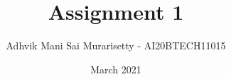 \documentclass[journal,12pt,twocolumn]{IEEEtran}
\date{March 2021}
\DeclareMathOperator*{\Res}{Res}
\begin{document}
\newcommand{\BEQA}{\begin{eqnarray}}
\newcommand{\EEQA}{\end{eqnarray}}
\newcommand{\define}{\stackrel{\triangle}{=}}

\raggedbottom
\setlength{\parindent}{0pt}
\providecommand{\mbf}{\mathbf}
\providecommand{\pr}[1]{\ensuremath{\Pr\left(#1\right)}}
\providecommand{\qfunc}[1]{\ensuremath{Q\left(#1\right)}}
\providecommand{\sbrak}[1]{\ensuremath{{}\left[#1\right]}}
\providecommand{\lsbrak}[1]{\ensuremath{{}\left[#1\right.}}
\providecommand{\rsbrak}[1]{\ensuremath{{}\left.#1\right]}}
\providecommand{\brak}[1]{\ensuremath{\left(#1\right)}}
\providecommand{\lbrak}[1]{\ensuremath{\left(#1\right.}}
\providecommand{\rbrak}[1]{\ensuremath{\left.#1\right)}}
\providecommand{\cbrak}[1]{\ensuremath{\left\{#1\right\}}}
\providecommand{\lcbrak}[1]{\ensuremath{\left\{#1\right.}}
\providecommand{\rcbrak}[1]{\ensuremath{\left.#1\right\}}}
\theoremstyle{remark}
\newtheorem{rem}{Remark}
\newcommand{\sgn}{\mathop{\mathrm{sgn}}}
\providecommand{\abs}[1]{\vert#1\vert}
\providecommand{\res}[1]{\Res\displaylimits_{#1}} 
\providecommand{\norm}[1]{\lVert#1\rVert}
\providecommand{\mtx}[1]{\mathbf{#1}}
\providecommand{\mean}[1]{E[ #1 ]}
\providecommand{\fourier}{\overset{\mathcal{F}}{ \rightleftharpoons}}
\providecommand{\system}{\overset{\mathcal{H}}{ \longleftrightarrow}}
\newcommand{\solution}{\noindent \textbf{Solution: }}
\newcommand{\cosec}{\,\text{cosec}\,}
\providecommand{\dec}[2]{\ensuremath{\overset{#1}{\underset{#2}{\gtrless}}}}
\newcommand{\myvec}[1]{\ensuremath{\begin{pmatrix}#1\end{pmatrix}}}
\newcommand{\mydet}[1]{\ensuremath{\begin{vmatrix}#1\end{vmatrix}}}
\makeatletter
{}
\makeatother
\let\StandardTheFigure\thefigure
\let\vec\mathbf
\renewcommand{\thefigure}{\theproblem}
\def\putbox#1#2#3{\makebox[0in][l]{\makebox[#1][l]{}\raisebox{\baselineskip}[0in][0in]{\raisebox{#2}[0in][0in]{#3}}}}
     \def\rightbox#1{\makebox[0in][r]{#1}}
     \def\centbox#1{\makebox[0in]{#1}}
     \def\topbox#1{\raisebox{-\baselineskip}[0in][0in]{#1}}
     \def\midbox#1{\raisebox{-0.5\baselineskip}[0in][0in]{#1}}
\vspace{3cm}
\title{Assignment 1}
\author{Adhvik Mani Sai Murarisetty - AI20BTECH11015}
\end{document}
